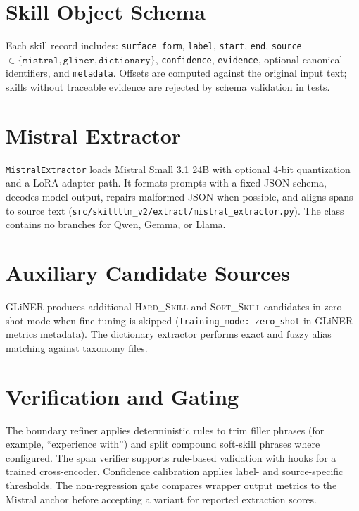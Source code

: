 \section{Skill Object Schema}

Each skill record includes: \texttt{surface\_form}, \texttt{label}, \texttt{start}, \texttt{end}, \texttt{source} $\in \{\texttt{mistral}, \texttt{gliner}, \texttt{dictionary}\}$, \texttt{confidence}, \texttt{evidence}, optional canonical identifiers, and \texttt{metadata}.
Offsets are computed against the original input text; skills without traceable evidence are rejected by schema validation in tests.

\section{Mistral Extractor}

\texttt{MistralExtractor} loads Mistral Small 3.1 24B with optional 4-bit quantization and a LoRA adapter path.
It formats prompts with a fixed JSON schema, decodes model output, repairs malformed JSON when possible, and aligns spans to source text (\texttt{src/skillllm\_v2/extract/mistral\_extractor.py}).
The class contains no branches for Qwen, Gemma, or Llama.

\section{Auxiliary Candidate Sources}

GLiNER produces additional \textsc{Hard\_Skill} and \textsc{Soft\_Skill} candidates in zero-shot mode when fine-tuning is skipped (\texttt{training\_mode: zero\_shot} in GLiNER metrics metadata).
The dictionary extractor performs exact and fuzzy alias matching against taxonomy files.

\section{Verification and Gating}

The boundary refiner applies deterministic rules to trim filler phrases (for example, ``experience with'') and split compound soft-skill phrases where configured.
The span verifier supports rule-based validation with hooks for a trained cross-encoder.
Confidence calibration applies label- and source-specific thresholds.
The non-regression gate compares wrapper output metrics to the Mistral anchor before accepting a variant for reported extraction scores.

